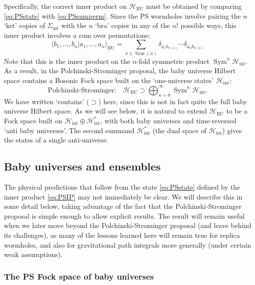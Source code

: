 \documentclass[letterpaper,12pt]{article}
\newcommand*{\hilb}{\mathcal{H}}	%
\newcommand*{\hbu}{\mathcal{H}_\text{BU}} %
\DeclareMathOperator{\Sym}{Sym}
\begin{document}
Specifically, the correct inner product on $\hbu$ must be obtained by comparing \eqref{eq:PSstate} with \eqref{eq:PSsumperm}.  Since the  PS wormholes involve pairing the $n$ `ket' copies of $\Sigma_\mathrm{int}$ with the $n$ `bra' copies in any of the $n!$ possible ways, this inner product involves  a sum over permutations:
\begin{equation}\label{eq:PSIP}
	\langle b_1,\ldots,b_n|a_1,\ldots,a_n \rangle_{\mathrm{BU}} = \sum_{\pi\in \Sym(n)} \delta_{a_1 b_{\pi(1)}}\cdots \delta_{a_n b_{\pi(n)}}
\end{equation}
Note that this is the inner product on the $n$-fold symmetric product $\Sym^n\hilb_\mathrm{int}$. As a result, in the Polchinski-Strominger proposal, the baby universe Hilbert space contains a Bosonic Fock space built on the `one-universe states' $\hilb_\mathrm{int}$:
\begin{equation}
\label{eq:PSIP5}
	\text{Polchinski-Strominger:}\quad \hbu \supset \bigoplus_{n=0}^\infty \Sym^n\hilb_\mathrm{int}.
\end{equation}
We have written `contains' ($\supset$) here, since this is not in fact quite the full baby universe Hilbert space. As we will see below, it is natural to extend $\hbu$ to be a Fock space built on $\hilb_\mathrm{int}\oplus \hilb_\mathrm{int}^*$, with both baby universes and time-reversed `anti baby universes'. The second summand $\hilb_\mathrm{int}^*$ (the dual space of $\hilb_\mathrm{int}$) gives the states of a single anti-universe.

\subsection{Baby universes and ensembles}\label{sec:BUensembles}

The physical predictions that follow from the state \eqref{eq:PSstate} defined by  the inner product \eqref{eq:PSIP} may not immediately be clear.   We will describe this in some detail below, taking advantage of the fact that the Polchinski-Strominger proposal is simple enough to allow explicit results.  The result will remain useful when we later move beyond the Polchinski-Strominger proposal (and leave behind its challenges), as many of the lessons learned here will remain true for replica wormholes, and also  for gravitational path integrals more generally (under certain weak assumptions).

\subsubsection{The PS Fock space of baby universes}
\end{document}

